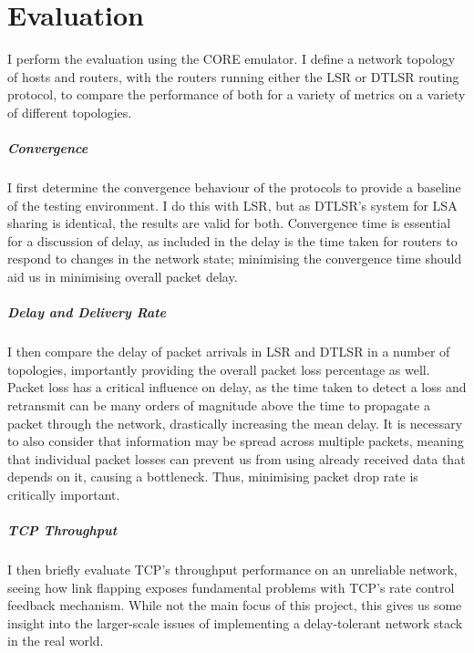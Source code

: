 \documentclass[withindex,glossary,openany]{cam-thesis}
\begin{document}
\chapter{Evaluation}
\label{chapter:evaluation}

I perform the evaluation using the CORE emulator. I define a network topology of hosts and routers, with the routers running either the LSR or DTLSR routing protocol, to compare the performance of both for a variety of metrics on a variety of different topologies.

\paragraph{Convergence}
I first determine the convergence behaviour of the protocols to provide a baseline of the testing environment. I do this with LSR, but as DTLSR's system for LSA sharing is identical, the results are valid for both. Convergence time is essential for a discussion of delay, as included in the delay is the time taken for routers to respond to changes in the network state; minimising the convergence time should aid us in minimising overall packet delay.


\paragraph{Delay and Delivery Rate}
I then compare the delay of packet arrivals in LSR and DTLSR in a number of topologies, importantly providing the overall packet loss percentage as well. Packet loss has a critical influence on delay, as the time taken to detect a loss and retransmit can be many orders of magnitude above the time to propagate a packet through the network, drastically increasing the mean delay. It is necessary to also consider that information may be spread across multiple packets, meaning that individual packet losses can prevent us from using already received data that depends on it, causing a bottleneck. Thus, minimising packet drop rate is critically important.

\paragraph{TCP Throughput}
I then briefly evaluate TCP's throughput performance on an unreliable network, seeing how link flapping exposes fundamental problems with TCP's rate control feedback mechanism. While not the main focus of this project, this gives us some insight into the larger-scale issues of implementing a delay-tolerant network stack in the real world.
\end{document}
